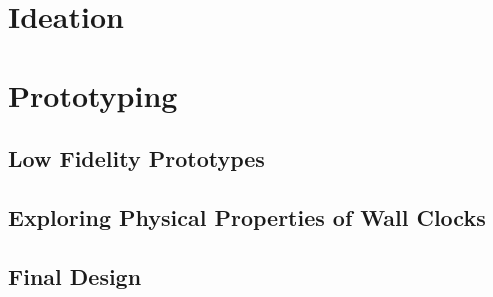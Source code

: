 \section{Ideation}
\section{Prototyping}
\subsection{Low Fidelity Prototypes}
\subsection{Exploring Physical Properties of Wall Clocks}
\subsection{Final Design}
